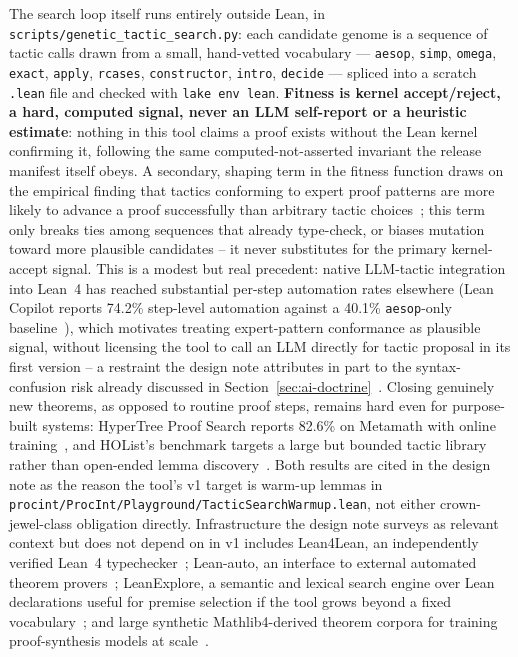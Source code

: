 \begin{center}

\end{center}

The search loop itself runs entirely outside Lean, in
\texttt{scripts/genetic\_tactic\_search.py}: each candidate genome is a
sequence of tactic calls drawn from a small, hand-vetted vocabulary ---
\texttt{aesop}, \texttt{simp}, \texttt{omega}, \texttt{exact},
\texttt{apply}, \texttt{rcases}, \texttt{constructor}, \texttt{intro},
\texttt{decide} --- spliced into a scratch \texttt{.lean} file and
checked with \texttt{lake env lean}. \textbf{Fitness is kernel
accept/reject, a hard, computed signal, never an LLM self-report or a
heuristic estimate}: nothing in this tool claims a proof exists without
the Lean kernel confirming it, following the same computed-not-asserted
invariant the release manifest itself obeys. A secondary, shaping term
in the fitness function draws on the empirical finding that tactics
conforming to expert proof patterns are more likely to advance a proof
successfully than arbitrary tactic
choices~\cite{tacticexpertalign2026}; this term only breaks ties among
sequences that already type-check, or biases mutation toward more
plausible candidates -- it never substitutes for the primary
kernel-accept signal. This is a modest but real precedent: native
LLM-tactic integration into Lean~4 has reached substantial per-step
automation rates elsewhere (Lean Copilot reports 74.2\% step-level
automation against a 40.1\% \texttt{aesop}-only
baseline~\cite{leancopilot2024}), which motivates treating expert-pattern
conformance as plausible signal, without licensing the tool to call an
LLM directly for tactic proposal in its first version -- a restraint the
design note attributes in part to the syntax-confusion risk already
discussed in Section~\ref{sec:ai-doctrine}~\cite{langconfusion2025}.
Closing genuinely new theorems, as opposed to routine proof steps,
remains hard even for purpose-built systems: HyperTree Proof Search
reports 82.6\% on Metamath with online
training~\cite{hypertree2022}, and HOList's benchmark targets a large but
bounded tactic library rather than open-ended lemma
discovery~\cite{holist2019}. Both results are cited in the design note as
the reason the tool's v1 target is warm-up lemmas in
\texttt{procint/ProcInt/Playground/TacticSearchWarmup.lean}, not either
crown-jewel-class obligation directly. Infrastructure the design note
surveys as relevant context but does not depend on in v1 includes
Lean4Lean, an independently verified Lean~4
typechecker~\cite{lean4lean2024}; Lean-auto, an interface to external
automated theorem provers~\cite{leanauto2025}; LeanExplore, a semantic
and lexical search engine over Lean declarations useful for premise
selection if the tool grows beyond a fixed vocabulary~\cite{leanexplore2025};
and large synthetic Mathlib4-derived theorem corpora for training
proof-synthesis models at scale~\cite{mathlib4dataset2025}.

